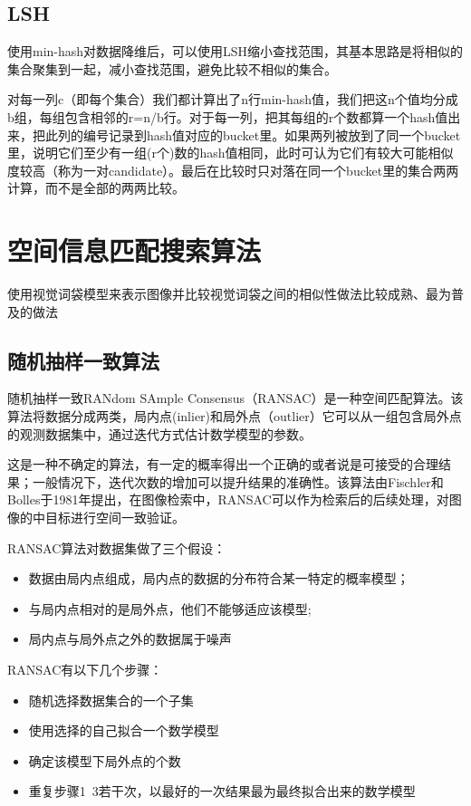 \subsection{LSH}
使用min-hash对数据降维后，可以使用LSH缩小查找范围，其基本思路是将相似的集合聚集到一起，减小查找范围，避免比较不相似的集合。

对每一列c（即每个集合）我们都计算出了n行min-hash值，我们把这n个值均分成b组，每组包含相邻的r=n/b行。对于每一列，把其每组的r个数都算一个hash值出来，把此列的编号记录到hash值对应的bucket里。如果两列被放到了同一个bucket里，说明它们至少有一组(r个)数的hash值相同，此时可认为它们有较大可能相似度较高（称为一对candidate）。最后在比较时只对落在同一个bucket里的集合两两计算，而不是全部的两两比较。


\section{空间信息匹配搜索算法}
使用视觉词袋模型来表示图像并比较视觉词袋之间的相似性做法比较成熟、最为普及的做法
\subsection{随机抽样一致算法}
随机抽样一致RANdom SAmple Consensus（RANSAC）是一种空间匹配算法。该算法将数据分成两类，局内点(inlier)和局外点（outlier）它可以从一组包含局外点的观测数据集中，通过迭代方式估计数学模型的参数。

这是一种不确定的算法，有一定的概率得出一个正确的或者说是可接受的合理结果；一般情况下，迭代次数的增加可以提升结果的准确性。该算法由Fischler和Bolles于1981年提出，在图像检索中，RANSAC可以作为检索后的后续处理，对图像的中目标进行空间一致验证。

RANSAC算法对数据集做了三个假设：

\begin{itemize}
\item 数据由局内点组成，局内点的数据的分布符合某一特定的概率模型；
\item 与局内点相对的是局外点，他们不能够适应该模型;
\item 局内点与局外点之外的数据属于噪声
\end{itemize}

RANSAC有以下几个步骤：
\begin{itemize}
\item 随机选择数据集合的一个子集
\item 使用选择的自己拟合一个数学模型
\item 确定该模型下局外点的个数
\item 重复步骤1~3若干次，以最好的一次结果最为最终拟合出来的数学模型
\end{itemize}

